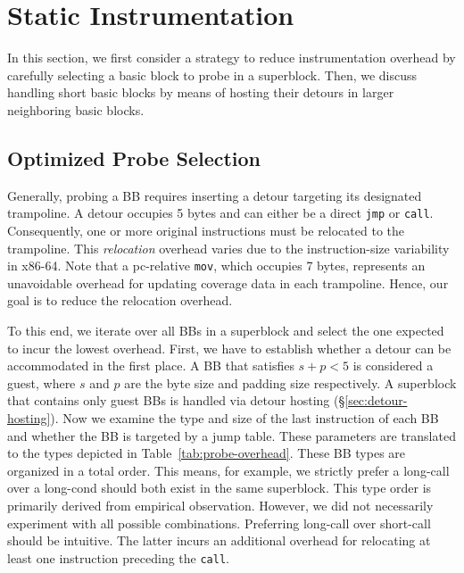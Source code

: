 
\section{Static Instrumentation}
\label{sec:instrumentation}
In this section, we first consider a strategy to reduce instrumentation overhead by carefully selecting a basic block to probe in a superblock.
Then, we discuss handling short basic blocks by means of hosting their detours in larger neighboring basic blocks.

\subsection{Optimized Probe Selection}
\label{sec:optimized-probe}


Generally, probing a BB requires inserting a detour targeting its designated trampoline.
A detour occupies 5 bytes and can either be a direct \texttt{jmp} or \texttt{call}.
Consequently, one or more original instructions must be relocated to the trampoline.
This \textit{relocation} overhead varies due to the instruction-size variability in x86-64.
Note that a pc-relative \texttt{mov}, which occupies 7 bytes, represents an unavoidable
overhead for updating coverage data in each trampoline.
Hence, our goal is to reduce the relocation overhead.

To this end, we iterate over all BBs in a superblock and select the one expected to incur the lowest overhead.
First, we have to establish whether a detour can be accommodated in the first place.
A BB that satisfies $s + p < 5 $ is considered a \textsf{guest}, where $s$ and $p$ are the byte size and padding size respectively.
A superblock that contains only \textsf{guest} BBs is handled via detour hosting (\S\ref{sec:detour-hosting}).
Now we examine the type and size of the last instruction of each BB and whether the BB is targeted by a jump table.
These parameters are translated to the types depicted in Table~\ref{tab:probe-overhead}.
These BB types are organized in a total order.
This means, for example, we strictly prefer a \textsf{long-call} over a \textsf{long-cond} should both exist in the same superblock.
This type order is primarily derived from empirical observation.
However, we did not necessarily experiment with all possible combinations.
Preferring \textsf{long-call} over \textsf{short-call} should be intuitive.
The latter incurs an additional overhead for relocating at least one instruction preceding the \texttt{call}.

